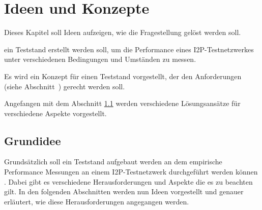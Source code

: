 \chapter{Ideen und Konzepte}
\label{ch:ideen_und_konzepte}

Dieses Kapitel soll Ideen aufzeigen, wie die Fragestellung gelöst werden soll.

ein Teststand erstellt werden soll, um die Performance eines I2P-Testnetzwerkes unter verschiedenen Bedingungen und Umständen zu messen.

Es wird ein Konzept für einen Teststand vorgestellt, der den Anforderungen (siehe Abschnitt~) gerecht werden soll.

Angefangen mit dem Abschnitt \ref{sec:grundidee} werden verschiedene Lösungsansätze für verschiedene Aspekte vorgestellt.



\section{Grundidee}\label{sec:grundidee}



Grundsätzlich soll ein Teststand aufgebaut werden an dem empirische Performance Messungen an einem I2P-Testnetzwerk durchgeführt werden können .
Dabei gibt es verschiedene Herausforderungen und Aspekte die es zu beachten gilt.
In den folgenden Abschnitten werden nun Ideen vorgestellt und genauer erläutert, wie diese Herausforderungen angegangen werden.

